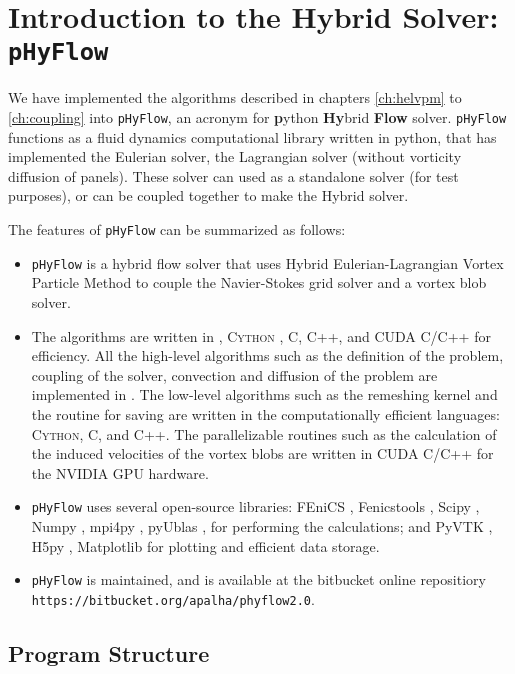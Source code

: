 \chapter{Introduction to the Hybrid Solver: \texttt{pHyFlow}}

We have implemented the algorithms described in chapters \ref{ch:helvpm} to \ref{ch:coupling} into \texttt{pHyFlow}, an acronym for \textbf{p}ython \textbf{Hy}brid \textbf{Flow} solver. \texttt{pHyFlow} functions  as a fluid dynamics computational library written in python, that has implemented the Eulerian solver, the Lagrangian solver (without vorticity diffusion of panels). These solver can used as a standalone solver (for test purposes), or can be coupled together to make the Hybrid solver. 


The features of \texttt{pHyFlow} can be summarized as follows:
\begin{itemize}
\item \texttt{pHyFlow} is a hybrid flow solver that uses Hybrid Eulerian-Lagrangian Vortex Particle Method to couple the Navier-Stokes grid solver and a vortex blob solver.
\item The algorithms are written in \python, \textsc{Cython} \cite{Behnel2011}, C, C++, and CUDA C/C++ for efficiency. All the high-level algorithms such as the definition of the problem, coupling of the solver, convection and diffusion of the problem are implemented in \python. The low-level algorithms such as the remeshing kernel and the routine for saving are written in the computationally efficient languages: \textsc{Cython}, C, and C++. The parallelizable routines such as the calculation of the induced velocities of the vortex blobs are written in CUDA C/C++ for the NVIDIA GPU hardware.
\item \texttt{pHyFlow} uses several open-source libraries: FEniCS \cite{Logg2012b}, Fenicstools \cite{fenicstools}, Scipy \cite{scipyLibrary}, Numpy \cite{VanDerWalt2011}, mpi4py \cite{Dalcin2008}, pyUblas \cite{pyublasLink}, for performing the calculations; and PyVTK \cite{pyublasLink}, H5py \cite{collette2013python}, Matplotlib \cite{Hunter:2007} for plotting and efficient data storage.
\item \texttt{pHyFlow} is maintained, and is available at the bitbucket online repositiory\\ \texttt{https://bitbucket.org/apalha/phyflow2.0}.
\end{itemize}


\section{Program Structure}

